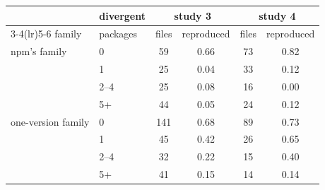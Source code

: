 \begin{tabular}{llcccc}
\toprule
& divergent & \multicolumn{2}{c}{study 3} & \multicolumn{2}{c}{study 4} \\
\cmidrule(lr){3-4}\cmidrule(lr){5-6}
family & packages & files & reproduced & files & reproduced \\
\midrule
npm's family & 0 & 59 & 0.66 & 73 & 0.82 \\
 & 1 & 25 & 0.04 & 33 & 0.12 \\
 & 2--4 & 25 & 0.08 & 16 & 0.00 \\
 & 5+ & 44 & 0.05 & 24 & 0.12 \\
\midrule
one-version family & 0 & 141 & 0.68 & 89 & 0.73 \\
 & 1 & 45 & 0.42 & 26 & 0.65 \\
 & 2--4 & 32 & 0.22 & 15 & 0.40 \\
 & 5+ & 41 & 0.15 & 14 & 0.14 \\
\bottomrule
\end{tabular}
